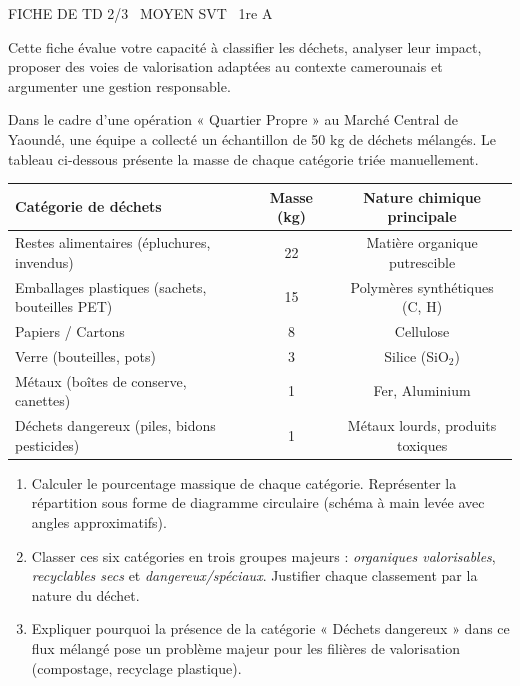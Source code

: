 \documentclass[11pt]{article}
\begin{document}
\begin{tcolorbox}[enhanced,colback=popink,colframe=popink,arc=10pt,boxrule=0pt,left=12pt,right=12pt,top=9pt,bottom=9pt]
{\color{white}\popxbold\small FICHE DE TD 2/3 \textbullet\ MOYEN \hfill SVT \textbullet\ 1re A\par}
\end{tcolorbox}
\vspace{4pt}
Cette fiche évalue votre capacité à classifier les déchets, analyser leur impact, proposer des voies de valorisation adaptées au contexte camerounais et argumenter une gestion responsable.

\begin{exercice}
Dans le cadre d'une opération « Quartier Propre » au Marché Central de Yaoundé, une équipe a collecté un échantillon de 50 kg de déchets mélangés. Le tableau ci-dessous présente la masse de chaque catégorie triée manuellement.

\begin{tabular}{|l|c|c|}
\hline
\textbf{Catégorie de déchets} & \textbf{Masse (kg)} & \textbf{Nature chimique principale} \\
\hline
Restes alimentaires (épluchures, invendus) & 22 & Matière organique putrescible \\
\hline
Emballages plastiques (sachets, bouteilles PET) & 15 & Polymères synthétiques (C, H) \\
\hline
Papiers / Cartons & 8 & Cellulose \\
\hline
Verre (bouteilles, pots) & 3 & Silice (SiO$_2$) \\
\hline
Métaux (boîtes de conserve, canettes) & 1 & Fer, Aluminium \\
\hline
Déchets dangereux (piles, bidons pesticides) & 1 & Métaux lourds, produits toxiques \\
\hline
\end{tabular}

\begin{enumerate}
    \item Calculer le pourcentage massique de chaque catégorie. Représenter la répartition sous forme de diagramme circulaire (schéma à main levée avec angles approximatifs).
    \item Classer ces six catégories en trois groupes majeurs : \textit{organiques valorisables}, \textit{recyclables secs} et \textit{dangereux/spéciaux}. Justifier chaque classement par la nature du déchet.
    \item Expliquer pourquoi la présence de la catégorie « Déchets dangereux » dans ce flux mélangé pose un problème majeur pour les filières de valorisation (compostage, recyclage plastique).
\end{enumerate}
\end{exercice}
\end{document}
